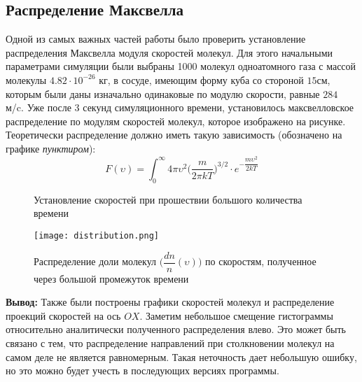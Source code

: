\documentclass[twoside,twocolumn]{article}
\theoremstyle{plain}
\theoremstyle{definition}
\begin{document}
\subsection{Распределение Максвелла}
\indent Одной из самых важных частей работы было проверить установление распределения Максвелла модуля скоростей молекул. Для этого начальными параметрами симуляции были выбраны 1000 молекул одноатомного газа с массой молекулы $4.82 \cdot 10^{-26}$ кг, в сосуде, имеющим форму куба со стороной $15$см, которым были даны изначально одинаковые по модулю скорости, равные $284$ м/c. Уже после 3 секунд симуляционного времени, установилось максвелловское распределение по модулям скоростей молекул, которое изображено на рисунке.\\

\indent Теоретически распределение должно иметь такую зависимость (обозначено на графике \textit{пунктиром}):
\begin{equation}
F(\upsilon) = \int_0^\infty 4\pi\upsilon^2 \Big( \dfrac{m}{2\pi kT} \Big)^{3/2}\cdot e^{-\dfrac{m \upsilon^2}{2kT}}
\end{equation}

\begin{figure}[h]

\begin{minipage}[H]{0.49\linewidth}
\end{minipage}
\begin{minipage}[H]{0.49\linewidth}
\end{minipage}

\caption{Установление скоростей при прошествии большого количества времени}

\end{figure}

\begin{figure}[!h]
{\texttt{[image: distribution.png]}}
\caption{Распределение доли молекул $\Big(\dfrac{dn}{n} (\upsilon) \Big)$ по скоростям, полученное через большой промежуток времени}
\end{figure}

\textbf{Вывод:}
Также были построены графики скоростей молекул и распределение проекций скоростей на ось $OX$. Заметим небольшое смещение гистограммы относительно аналитически полученного распределения влево. Это может быть связано с тем, что распределение направлений при столкновении молекул на самом деле не является равномерным. Такая неточность дает небольшую ошибку, но это можно будет учесть в последующих версиях программы.
\end{document}
